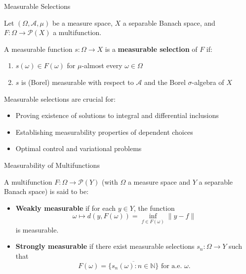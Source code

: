 \documentclass[aspectratio=169,10pt]{beamer}
\begin{document}
\begin{frame}{Measurable Selections}
\begin{definition}
Let $(\Omega, \mathcal{A}, \mu)$ be a measure space, $X$ a separable Banach space, and $F: \Omega \to \mathcal{P}(X)$ a multifunction.

A measurable function $s: \Omega \to X$ is a \textbf{measurable selection} of $F$ if:
\begin{enumerate}
    \item $s(\omega) \in F(\omega)$ for $\mu$-almost every $\omega \in \Omega$
    \item $s$ is (Borel) measurable with respect to $\mathcal{A}$ and the Borel $\sigma$-algebra of $X$
\end{enumerate}
\end{definition}

\vspace{0.3cm}

\begin{remark}
Measurable selections are crucial for:
\begin{itemize}
    \item Proving existence of solutions to integral and differential inclusions
    \item Establishing measurability properties of dependent choices
    \item Optimal control and variational problems
\end{itemize}
\end{remark}
\end{frame}

\begin{frame}{Measurability of Multifunctions}
\begin{definition}
A multifunction $F: \Omega \to \mathcal{P}(Y)$ (with $\Omega$ a measure space and $Y$ a separable Banach space) is said to be:

\begin{itemize}
    \item \textbf{Weakly measurable} if for each $y \in Y$, the function
    $$\omega \mapsto d(y, F(\omega)) = \inf_{f \in F(\omega)} \|y - f\|$$
    is measurable.

    \item \textbf{Strongly measurable} if there exist measurable selections $s_n: \Omega \to Y$ such that
    $$F(\omega) = \overline{\{s_n(\omega): n \in \mathbb{N}\}} \text{ for a.e. } \omega.$$
\end{itemize}
\end{definition}
\end{frame}
\end{document}
